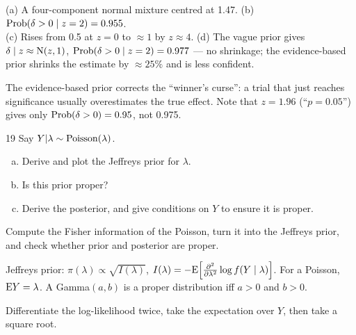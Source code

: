 \documentclass[11pt]{article}
\begin{document}
\begin{answer}
(a) A four-component normal mixture centred at 1.47. \quad (b) $\mathrm{Prob}(\delta>0\mid z=2)=0.955$.\\
(c) Rises from 0.5 at $z=0$ to $\approx1$ by $z\approx4$. \quad (d) The vague prior gives $\delta\mid z\approx\mathrm{N}(z,1)$, $\mathrm{Prob}(\delta>0\mid z=2)=0.977$ --- no shrinkage; the evidence-based prior shrinks the estimate by $\approx25\%$ and is less confident.
\end{answer}

\begin{takeaway}
The evidence-based prior corrects the ``winner's curse'': a trial that just reaches significance usually overestimates the true effect. Note that $z=1.96$ (``$p=0.05$'') gives only $\mathrm{Prob}(\delta>0)=0.95$, not 0.975.
\end{takeaway}


\begin{problem}{19}
Say $Y|\lambda\sim\mathrm{Poisson}(\lambda)$.
\begin{enumerate}[(a)]
\item Derive and plot the Jeffreys prior for $\lambda$.
\item Is this prior proper?
\item Derive the posterior, and give conditions on $Y$ to ensure it is proper.
\end{enumerate}
\end{problem}

\begin{restate}
Compute the Fisher information of the Poisson, turn it into the Jeffreys prior, and check whether prior and posterior are proper.
\end{restate}

\begin{recall}
Jeffreys prior: $\pi(\lambda)\propto\sqrt{I(\lambda)}$, $I(\lambda)=-\mathrm{E}\Big[\frac{\partial^2}{\partial\lambda^2}\log f(Y\mid\lambda)\Big]$. For a Poisson, $\mathrm{E} Y=\lambda$. A Gamma$(a,b)$ is a proper distribution iff $a>0$ and $b>0$.
\end{recall}

\begin{keyidea}
Differentiate the log-likelihood twice, take the expectation over $Y$, then take a square root.
\end{keyidea}
\end{document}
